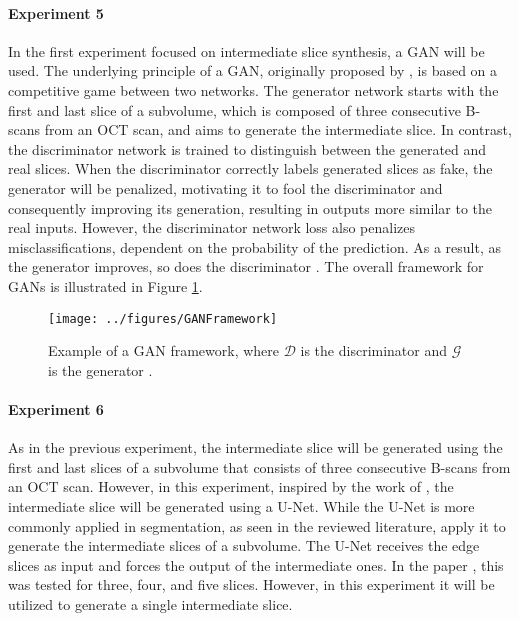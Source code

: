 \paragraph{Experiment 5}
In the first experiment focused on intermediate slice synthesis, a GAN will be used. The underlying principle of a GAN, originally proposed by \textcite{Goodfellow2014}, is based on a competitive game between two networks. The generator network starts with the first and last slice of a subvolume, which is composed of three consecutive B-scans from an OCT scan, and aims to generate the intermediate slice. In contrast, the discriminator network is trained to distinguish between the generated and real slices. When the discriminator correctly labels generated slices as fake, the generator will be penalized, motivating it to fool the discriminator and consequently improving its generation, resulting in outputs more similar to the real inputs. However, the discriminator network loss also penalizes misclassifications, dependent on the probability of the prediction. As a result, as the generator improves, so does the discriminator \parencite{Goodfellow2020}. The overall framework for GANs is illustrated in Figure \ref{fig:GANFramework}.

\begin{figure}[!ht]
	\centering
	\texttt{[image: ../figures/GANFramework]}
	\caption{Example of a GAN framework, where $\mathcal{D}$ is the discriminator and $\mathcal{G}$ is the generator \cite{Creswell2018}.}
	\label{fig:GANFramework}
\end{figure}

\paragraph{Experiment 6}
As in the previous experiment, the intermediate slice will be generated using the first and last slices of a subvolume that consists of three consecutive B-scans from an OCT scan. However, in this experiment, inspired by the work of \textcite{Nishimoto2024}, the intermediate slice will be generated using a U-Net. While the U-Net is more commonly applied in segmentation, as seen in the reviewed literature, \textcite{Nishimoto2024} apply it to generate the intermediate slices of a subvolume. The U-Net receives the edge slices as input and forces the output of the intermediate ones. In the paper \parencite{Nishimoto2024}, this was tested for three, four, and five slices. However, in this experiment it will be utilized to generate a single intermediate slice.

